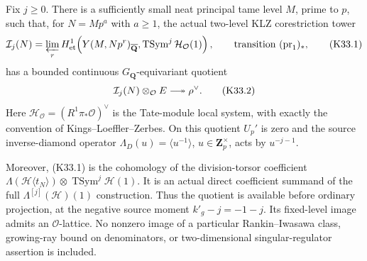 \begin{proposition}
\label{AC-K33}
Fix \(j\geq0\).  There is a sufficiently small neat principal tame
level \(M\), prime to \(p\), such that, for \(N=Mp^a\)
with \(a\geq1\), the actual two-level KLZ corestriction tower
\[
 \mathcal I_j(N)=
 \varprojlim_r H^1_{\mathrm{et}}\!
 \left(Y(M,Np^r)_{\overline{\mathbf Q}},
       \operatorname{TSym}^j\mathcal H_{\mathcal O}(1)\right),
 \qquad\text{transition }(\operatorname{pr}_1)_*,
 \tag{K33.1}
\]
has a bounded continuous \(G_{\mathbf Q}\)-equivariant quotient
\[
 \mathcal I_j(N)\otimes_{\mathcal O}E
       \longtwoheadrightarrow \rho^\vee .
 \tag{K33.2}
\]
Here \(\mathcal H_{\mathcal O}=(R^1\pi_*\mathcal O)^\vee\)
is the Tate-module local system, with exactly the convention of
Kings--Loeffler--Zerbes.  On this quotient \(U_p'\) is zero and the
source inverse-diamond operator
\(\Lambda_D(u)=\langle u^{-1}\rangle\), \(u\in\mathbf Z_p^\times\),
acts by \(u^{-j-1}\).

Moreover, (K33.1) is the cohomology of the division-torsor coefficient
\(\Lambda(\mathcal H\langle t_N\rangle)\otimes
\operatorname{TSym}^j\mathcal H(1)\).  It is an actual direct coefficient
summand of the full \(\Lambda^{[j]}(\mathcal H)(1)\) construction.
Thus the quotient is available before ordinary projection, at the
negative source moment \(k'_g-j=-1-j\).  Its fixed-level image admits
an \(\mathcal O\)-lattice.  No nonzero image of a particular
Rankin--Iwasawa class, growing-ray bound on denominators, or
two-dimensional singular-regulator assertion is included.
\end{proposition}

